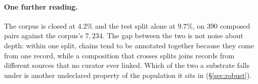 \paragraph{One further reading.} The corpus is closed at $4.2\%$ and the test split alone at
$9.7\%$, on $390$ composed pairs against the corpus's $7{,}234$. The gap between the two is not
noise about depth: within one split, chains tend to be annotated together because they come from one
record, while a composition that crosses splits joins records from different sources that no curator
ever linked. Which of the two a substrate falls under is another undeclared property of the
population it sits in (\S\ref{sec:robust}).
